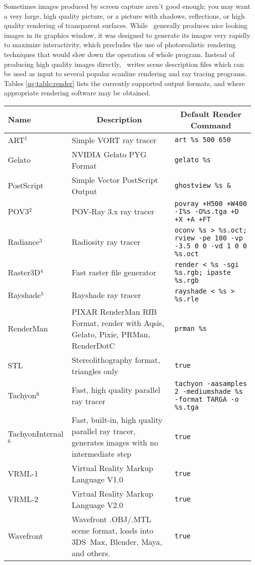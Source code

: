 Sometimes images produced by screen capture aren't good enough; 
you may want a very large, high quality picture, or a picture 
with shadows, reflections, or high quality rendering of transparent surfaces.  
While \VMD\ generally produces nice looking images in its graphics window,
it was designed to generate its images very rapidly to maximize
interactivity, which precludes the use of photorealistic rendering 
techniques that would slow down the operation of whole program.
Instead of producing high quality images directly, \VMD\ writes 
scene description files which can be used as input to several popular 
scanline rendering and ray tracing programs.  
Tables \ref{ug:table:render} lists the currently 
supported output formats, and where appropriate rendering software 
may be obtained.

\begin{table}[htb]
\begin{tabular}{|p{1.1 in}| p{2.5 in}| p{2.5in}| } 
\hline
  Name & \multicolumn{1}{|c}{Description} &
        \multicolumn{1}{|c|}{Default Render Command} \\ \hline\hline
  ART$^1$	& Simple VORT ray tracer		&
     {\tt art \%s 500 650} \\
  Gelato		& NVIDIA Gelato PYG Format		&
     {\tt gelato \%s} \\
  PostScript		& Simple Vector PostScript Output	&
     {\tt ghostview \%s \&} \\
  POV3$^2$      & POV-Ray 3.x ray tracer		&
     {\tt povray +H500 +W400 -I\%s -O\%s.tga +D +X +A +FT} \\
  Radiance$^3$	& Radiosity ray tracer	&
     {\tt oconv \%s > \%s.oct; rview -pe 100 -vp -3.5 0 0 -vd 1 0 0 \%s.oct} \\
  Raster3D$^4$		& Fast raster file generator		&
     {\tt render < \%s -sgi \%s.rgb; ipaste \%s.rgb} \\
  Rayshade$^5$	& Rayshade ray tracer			&
     {\tt rayshade < \%s > \%s.rle} \\ 
  RenderMan		& PIXAR RenderMan RIB Format, render 
     with Aqsis, Gelato, Pixie, PRMan, RenderDotC  & {\tt prman \%s} \\
  STL			& Stereolithography format, triangles only  &
     {\tt true} \\
  Tachyon$^6$   & Fast, high quality parallel ray tracer   &
     {\tt tachyon -aasamples 2 -mediumshade \%s -format TARGA -o \%s.tga} \\
  TachyonInternal$^6$   & Fast, built-in, high quality parallel ray tracer, generates images with no intermediate step &
     {\tt true} \\
  VRML-1		& Virtual Reality Markup Language V1.0  &
     {\tt true} \\
  VRML-2		& Virtual Reality Markup Language V2.0  &
     {\tt true} \\
  Wavefront		& Wavefront .OBJ/.MTL scene format, loads into 3DS~Max, Blender, Maya, and others. &
     {\tt true} \\
\hline


\end{tabular}
\end{table}
